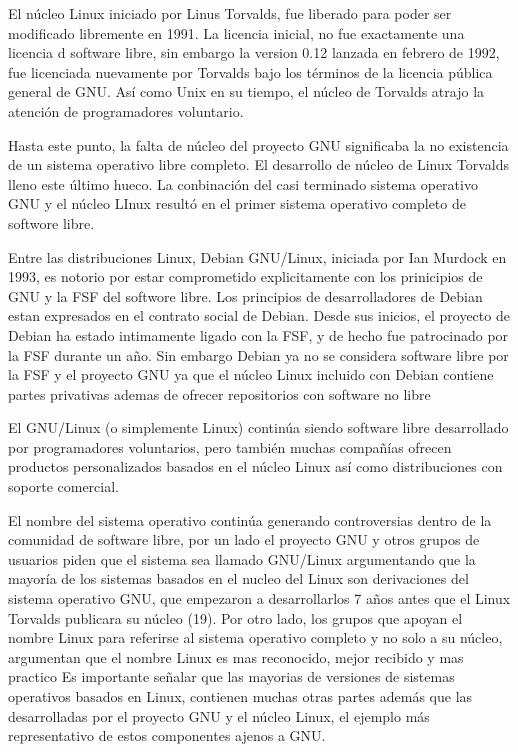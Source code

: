 El núcleo Linux iniciado por Linus Torvalds, fue liberado para poder ser modificado libremente en 1991. La licencia inicial, no fue exactamente una licencia d software libre, sin embargo la version 0.12 lanzada en febrero de 1992, fue licenciada nuevamente por Torvalds bajo los términos de la licencia pública general de GNU. Así como Unix en su tiempo, el núcleo de Torvalds atrajo la atención de programadores voluntario.

Hasta este punto, la falta de núcleo del proyecto GNU significaba la no existencia de un sistema operativo libre completo. El desarrollo de núcleo de Linux Torvalds lleno este último hueco. La conbinación del casi terminado sistema operativo GNU y el núcleo LInux resultó en el primer sistema operativo completo de softwore libre.

Entre las distribuciones Linux, Debian GNU/Linux, iniciada por Ian Murdock en 1993, es notorio por estar comprometido explicitamente con los prinicipios de GNU y la FSF del softwore libre. Los principios de desarrolladores de Debian estan expresados en el contrato social de Debian. Desde sus inicios, el proyecto de Debian ha estado intimamente ligado con la FSF, y de hecho fue patrocinado por la FSF durante un año. Sin embargo Debian ya no se considera software libre por la FSF y el proyecto GNU ya que el núcleo Linux incluido con Debian contiene partes privativas ademas de ofrecer repositorios con software no libre %

El GNU/Linux (o simplemente Linux) continúa siendo software libre desarrollado por programadores voluntarios, pero también muchas compañías ofrecen productos personalizados basados en el núcleo Linux así como distribuciones con soporte comercial.

El nombre del sistema operativo continúa generando controversias dentro de la comunidad de software libre, por un lado el proyecto GNU y otros grupos de usuarios piden que el sistema sea llamado GNU/Linux argumentando que la mayoría de los sistemas basados en el nucleo del Linux son derivaciones del sistema operativo GNU, que empezaron a desarrollarlos 7 años antes que el Linux Torvalds publicara su núcleo (19). Por otro lado, los grupos que apoyan el nombre Linux para referirse al sistema operativo completo y no solo a su núcleo, argumentan que el nombre Linux es mas reconocido, mejor recibido y mas practico %
 Es importante señalar que las mayorias de versiones de sistemas operativos basados en Linux, contienen muchas otras partes además que las desarrolladas por el proyecto GNU y el núcleo Linux, el ejemplo más representativo de estos componentes ajenos a GNU.

